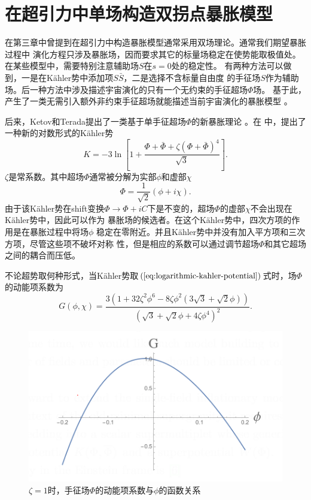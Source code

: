 \section{在超引力中单场构造双拐点暴胀模型}
在第三章中曾提到在超引力中构造暴胀模型通常采用双场理论。通常我们期望暴胀过程中
演化方程只涉及暴胀场，因而要求其它的标量场稳定在使势能取极值处。
在某些模型中，需要特别注意辅助场$S$在$s=0$处的稳定性。
有两种方法可以做到，一是在K\"ahler势中添加项$S\bar{S}$，二是选择不含标量自由度
的手征场$S$作为辅助场。后一种方法中涉及描述宇宙演化的只有一个无约束的手征超场$\Phi$场。
基于此，产生了一类无需引入额外非约束手征超场就能描述当前宇宙演化的暴胀模型
\citep{kallosh2015inflation,dall2014sgoldstino,linde2015does} 。


后来，Ketov和Terada提出了一类基于单手征超场$\Phi$的新暴胀理论
\citep{ketov2014generic,ketov2014inflation}。在 \citep{ketov2014generic}
中，提出了一种新的对数形式的K\"ahler势
\begin{equation}
  \label{eq:logarithmic-kahler-potential}
  K =
-3\ln \left[1+\frac{\Phi+\bar{\Phi}+\zeta{\left(\Phi+\bar{\Phi}\right)}^{4}}{\sqrt{3}}\right].
\end{equation}
$\zeta$是常系数。其中超场$\Phi$通常被分解为实部$\phi$和虚部$\chi$
\begin{equation}
  \Phi = \frac{1}{\sqrt{2}}(\phi+i\chi). 
\end{equation}
由于该K\"ahler势在shift变换$\Phi\rightarrow
\Phi+iC$下是不变的，超场$\Phi$的虚部$\chi$不会出现在K\"ahler势中，因此可以作为
暴胀场的候选者。在这个K\"ahler势中，四次方项的作用是在暴胀过程中将场$\phi$
稳定在零附近。并且K\"ahler势中并没有加入平方项和三次方项，尽管这些项不破坏对称
性，但是相应的系数可以通过调节超场$\Phi$和其它超场之间的耦合而压低。

不论超势取何种形式，当K\"ahler势取$(\ref{eq:logarithmic-kahler-potential})$式时，场$\Phi$的动能项系数为
\begin{equation}
  \label{eq:kinetic-coefficient-of-Phi}
  G(\phi,\chi) =
  \frac{3(1+32\zeta^2\phi^{6}-8\zeta\phi^2(3\sqrt{3}+\sqrt{2}\phi))}{{\left(\sqrt{3}+\sqrt{2}\phi+4\zeta\phi^{4}\right)}^2}.
\end{equation}

\begin{figure}[!http]
  \centering
  \includegraphics[width=5in]{Img/kinetic_coefficient_for_Phi.png}
  \caption{$\zeta=1$时，手征场$\Phi$的动能项系数与$\phi$的函数关系}\label{fig:kinetic-coefficient_for_Phi}
\end{figure}


